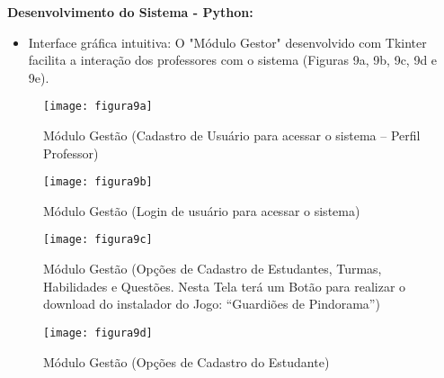             \item \textbf{Desenvolvimento do Sistema - Python:}
            \begin{itemize}[leftmargin=2em]
                \item Interface gráfica intuitiva: O "Módulo Gestor" desenvolvido com Tkinter facilita a interação dos professores com o sistema (Figuras 9a, 9b, 9c, 9d e 9e).
            \end{itemize}
            
                    
                    \begin{figure}[!h]
                        \centering
                        \caption{  Módulo Gestão (Cadastro de Usuário para acessar o sistema – Perfil Professor)  }%
                        \label{fig:figura9a}
                        \texttt{[image: figura9a]}
                        \end{figure}

                        \begin{figure}[!h]
                            \centering
                            \caption{ Módulo Gestão (Login de usuário para acessar o sistema)  }%
                            \label{fig:figura9b}
                            \texttt{[image: figura9b]}
                            \end{figure}


                            \begin{figure}[!h]
                                \centering
                                \caption{ Módulo Gestão (Opções de Cadastro de Estudantes, Turmas, Habilidades e Questões. Nesta Tela terá um Botão para realizar o download do instalador do Jogo: “Guardiões de Pindorama”) }%
                                \label{fig:figura9c}
                                \texttt{[image: figura9c]}
                                \end{figure}


                                \begin{figure}[!h]
                                    \centering
                                    \caption{ Módulo Gestão (Opções de Cadastro do Estudante)  }%
                                    \label{fig:figura9d}
                                    \texttt{[image: figura9d]}
                                    \end{figure}

